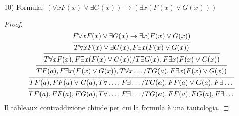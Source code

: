 10)
Formula: $(\forall x F(x) \lor \exists G(x)) \rightarrow (\exists x (F(x) \lor G(x)))$
\begin{proof}
\begin{equation*}
\begin{prooftree}
\hypo{F \forall x F(x) \lor \exists G(x) \rightarrow \exists x (F(x) \lor G(x))}
\infer1{T \forall x F(x) \lor \exists G(x),F \exists x (F(x) \lor G(x))}
\infer1{T \forall x F(x),F \exists x (F(x) \lor G(x))/T \exists G(x),F \exists x (F(x) \lor G(x))}
\infer1{T F(a),F \exists x (F(x) \lor G(x)),T \forall x \dots/T G(a),F \exists x (F(x) \lor G(x))}
\infer1{T F(a),F F(a) \lor G(a),T \forall \dots,F \exists \dots/T G(a),F F(a) \lor G(a),F \exists \dots}
\infer1{T F(a),F F(a),F G(a),T \forall \dots,F \exists \dots/T G(a),F F(a),F G(a),F \exists \dots}
\end{prooftree}
\end{equation*}
Il tableaux contraddizione chiude per cui la formula è una tautologia.
\end{proof}
